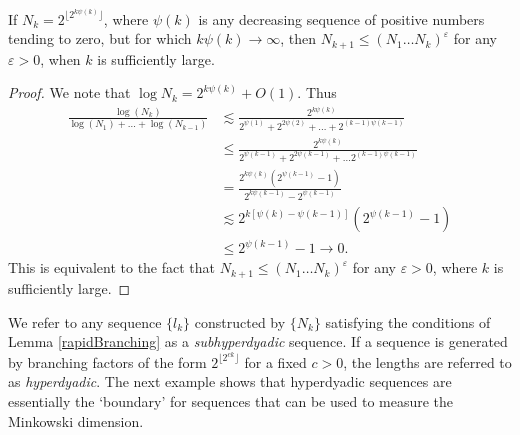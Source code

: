 \begin{lemma} \label{rapidBranching}
	If $N_k = 2^{\lfloor 2^{k \psi(k)} \rfloor}$, where $\psi(k)$ is any decreasing sequence of positive numbers tending to zero, but for which $k \psi(k) \to \infty$, then $N_{k+1} \leq (N_1 \dots N_k)^\varepsilon$ for any $\varepsilon > 0$, when $k$ is sufficiently large.
\end{lemma}
\begin{proof}
	We note that $\log N_k = 2^{k \psi(k)} + O(1)$. Thus
	\begin{align*}
		\frac{\log(N_k)}{\log(N_1) + \dots + \log(N_{k-1})} &\lesssim \frac{2^{k \psi(k)}}{2^{\psi(1)} + 2^{2 \psi(2)} + \dots + 2^{(k-1) \psi(k-1)}}\\
		&\leq \frac{2^{k \psi(k)}}{2^{\psi(k-1)} + 2^{2 \psi(k-1)} + \dots 2^{(k-1) \psi(k-1)}}\\
		&= \frac{2^{k \psi(k)} ( 2^{\psi(k-1)} - 1 )}{2^{k \psi(k-1)} - 2^{\psi(k-1)}} \\
		&\lesssim 2^{k[\psi(k) - \psi(k-1)]} (2^{\psi(k-1)} - 1)\\
		&\leq 2^{\psi(k-1)} - 1 \to 0.
	\end{align*}
	This is equivalent to the fact that $N_{k+1} \leq (N_1 \dots N_k)^\varepsilon$ for any $\varepsilon > 0$, where $k$ is sufficiently large.
\end{proof}
%
We refer to any sequence $\{ l_k \}$ constructed by $\{ N_k \}$ satisfying the conditions of Lemma \ref{rapidBranching} as a \emph{subhyperdyadic} sequence. If a sequence is generated by branching factors of the form $2^{\lfloor 2^{ck} \rfloor}$ for a fixed $c > 0$, the lengths are referred to as \emph{hyperdyadic}. The next example shows that hyperdyadic sequences are essentially the `boundary' for sequences that can be used to measure the Minkowski dimension.

